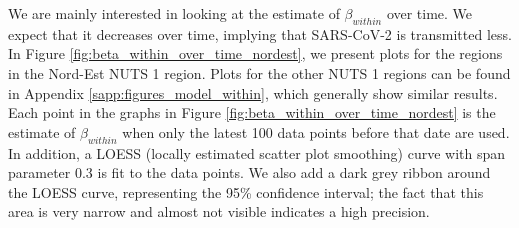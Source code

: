 \documentclass[12pt]{article}
\begin{document}
	We are mainly interested in looking at the estimate of $\beta_{within}$ over time. We expect that it decreases over time, implying that SARS-CoV-2 is transmitted less. In Figure \ref{fig:beta_within_over_time_nordest}, we present plots for the regions in the Nord-Est NUTS 1 region. Plots for the other NUTS 1 regions can be found in Appendix \ref{sapp:figures_model_within}, which generally show similar results. Each point in the graphs in Figure \ref{fig:beta_within_over_time_nordest} is the estimate of $\beta_{within}$ when only the latest 100 data points before that date are used. In addition, a LOESS (locally estimated scatter plot smoothing) curve with span parameter 0.3 is fit to the data points. We also add a dark grey ribbon around the LOESS curve, representing the 95\% confidence interval; the fact that this area is very narrow and almost not visible indicates a high precision. \\
	
\end{document}
